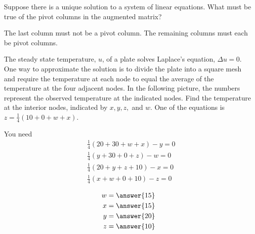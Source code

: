 \documentclass{ximera}
\begin{document}
\begin{problem}\label{prb:2.42} Suppose there is a unique solution to a system of linear equations.
What must be true of the pivot columns in the augmented matrix?
\begin{hint}
The last column must not be a pivot column. The remaining columns must each be pivot
columns.
\end{hint}
\end{problem}


\begin{problem}\label{prb:2.43} The steady state temperature, $u$, of a plate solves Laplace's
equation, $\Delta u=0.$ One way to approximate the solution is to divide the plate into a square mesh and require the temperature
at each node to equal the average of the temperature at the four adjacent
nodes. In the following picture, the numbers represent the observed
temperature at the indicated nodes. Find the temperature at
the interior nodes, indicated by $x,y,z,$ and $w$. One of the equations is
$z=\frac{1}{4}\left( 10+0+w+x\right) $.

\begin{center}
\end{center}

\begin{hint}
You need 
\begin{align*}
&\frac{1}{4}\left( 20+30+w+x\right) -y=0 \\
&\frac{1}{4}\left( y+30+0+z\right) -w=0 \\
&\frac{1}{4}\left( 20+y+z+10\right) -x=0 \\
&\frac{1}{4}\left( x+w+0+10\right) -z=0
\end{align*}
\end{hint}
 \begin{align*}
 w&=\answer{15}\\
 x&=\answer{15}\\
 y&=\answer{20}\\
 z&=\answer{10}\\
 \end{align*}
\end{problem}
\end{document}
